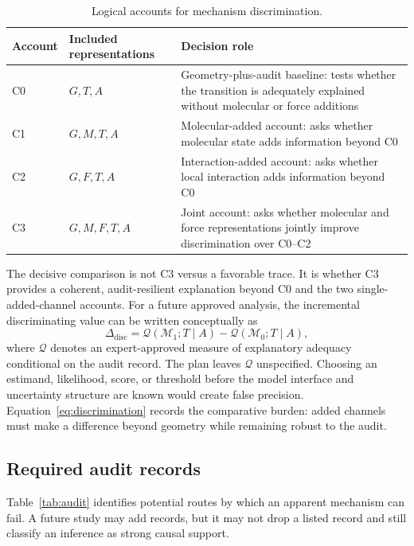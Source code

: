 \documentclass[conference]{IEEEtran}
\begin{document}
\begin{table}[!t]
\caption{Logical accounts for mechanism discrimination.}
\label{tab:accounts}
\centering
\footnotesize
\begin{tabular}{@{}L{0.13\columnwidth}L{0.36\columnwidth}L{0.39\columnwidth}@{}}
\toprule
Account & Included representations & Decision role \\
\midrule
C0 & $G,T,A$ & Geometry-plus-audit baseline: tests whether the transition is adequately explained without molecular or force additions \\
C1 & $G,M,T,A$ & Molecular-added account: asks whether molecular state adds information beyond C0 \\
C2 & $G,F,T,A$ & Interaction-added account: asks whether local interaction adds information beyond C0 \\
C3 & $G,M,F,T,A$ & Joint account: asks whether molecular and force representations jointly improve discrimination over C0--C2 \\
\bottomrule
\end{tabular}
\end{table}

The decisive comparison is not C3 versus a favorable trace. It is whether C3 provides a coherent, audit-resilient explanation beyond C0 and the two single-added-channel accounts. For a future approved analysis, the incremental discriminating value can be written conceptually as
\begin{equation}
\Delta_{\mathrm{disc}}=\mathcal{Q}(\mathcal{M}_{1};T\mid A)-\mathcal{Q}(\mathcal{M}_{0};T\mid A),
\label{eq:discrimination}
\end{equation}
where $\mathcal{Q}$ denotes an expert-approved measure of explanatory adequacy conditional on the audit record. The plan leaves $\mathcal{Q}$ unspecified. Choosing an estimand, likelihood, score, or threshold before the model interface and uncertainty structure are known would create false precision. Equation~\eqref{eq:discrimination} records the comparative burden: added channels must make a difference beyond geometry while remaining robust to the audit.

\subsection{Required audit records}

Table~\ref{tab:audit} identifies potential routes by which an apparent mechanism can fail. A future study may add records, but it may not drop a listed record and still classify an inference as strong causal support.
\end{document}
